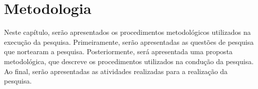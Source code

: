 

\chapter{Metodologia}
    \label{cha:metodologia}

    Neste capítulo, serão apresentados os procedimentos metodológicos utilizados na execução da pesquisa. Primeiramente, serão apresentadas as questões de pesquisa que nortearam a pesquisa. Posteriormente, será apresentada uma proposta metodológica, que descreve os procedimentos utilizados na condução da pesquisa. Ao final, serão apresentadas as atividades realizadas para a realização da pesquisa.

    

    

    

